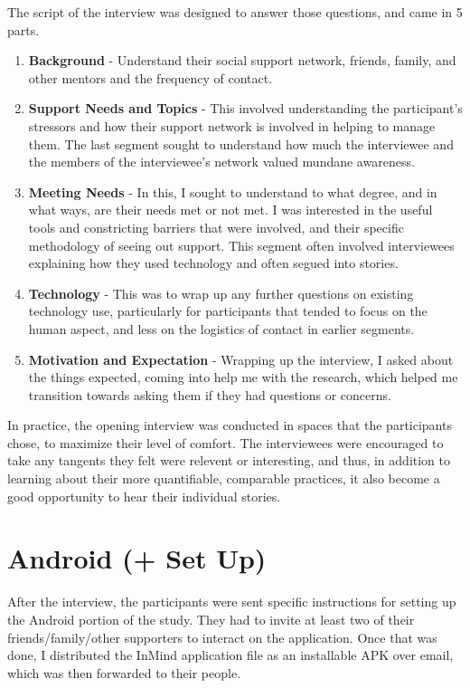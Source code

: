   The script of the interview was designed to answer those questions,
  and came in 5 parts.

  \begin{enumerate}
  \item \textbf{Background} -
    Understand their social support network,
    friends, family, and other mentors and the frequency of contact.
  \item \textbf{Support Needs and Topics} -
    This involved understanding the participant's stressors and how their
    support network is involved in helping to manage them.
    The last segment sought to understand how much the interviewee
    and the members of the interviewee's network valued
    mundane awareness.
  \item \textbf{Meeting Needs} -
    In this, I sought to understand to what degree,
    and in what ways, are their needs met or not met.
    I was interested in the useful tools and constricting barriers
    that were involved,
    and their specific methodology of seeing out support.
    This segment often involved interviewees explaining how they used technology
    and often segued into stories.
  \item \textbf{Technology} -
    This was to wrap up any further questions on existing technology use,
    particularly for participants that tended to focus on the human aspect,
    and less on the logistics of contact in earlier segments.
  \item \textbf{Motivation and Expectation} - 
    Wrapping up the interview, I asked about the things expected,
    coming into help me with the research,
    which helped me transition towards asking them if they had questions
    or concerns.
  \end{enumerate}

  In practice, the opening interview was conducted in spaces
  that the participants chose, to maximize their level of comfort.
  The interviewees were encouraged to take any tangents they felt
  were relevent or interesting, and thus,
  in addition to learning about their more quantifiable, comparable practices,
  it also become a good opportunity to hear their individual stories.

\section{Android (+ Set Up)}
  After the interview, the participants were sent specific instructions
  for setting up the Android portion of the study.
  They had to invite at least two of their friends/family/other supporters
  to interact on the application.
  Once that was done, I distributed the InMind application file as
  an installable APK over email, which was then forwarded to their people.

